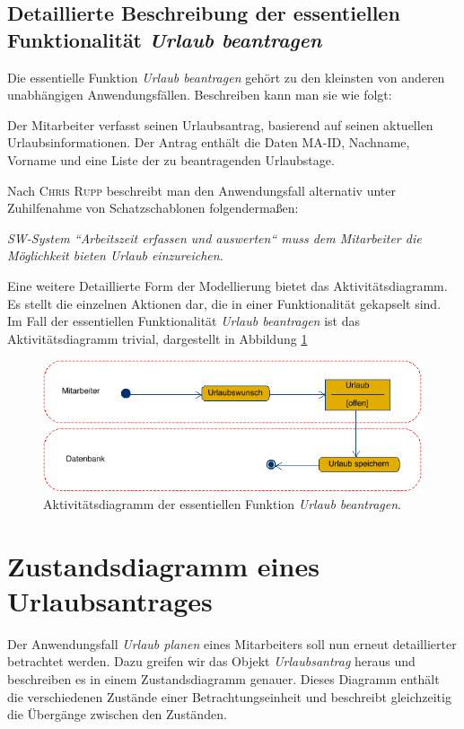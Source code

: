 \newpage

\section{Detaillierte Beschreibung der essentiellen Funktionalität \textit{Urlaub beantragen}}
Die essentielle Funktion \textit{Urlaub beantragen} geh\"ort zu den kleinsten von anderen unabh\"angigen Anwendungsf\"allen. Beschreiben kann man sie wie folgt: \newline 

Der Mitarbeiter verfasst seinen Urlaubsantrag, basierend auf seinen aktuellen Urlaubsinformationen. Der Antrag enth\"alt die Daten MA-ID, Nachname, Vorname und eine Liste der zu beantragenden Urlaubstage. \newline 

Nach \textsc{Chris Rupp} beschreibt man den Anwendungsfall alternativ unter Zuhilfenahme von Schatzschablonen folgenderma{\ss}en: \newline

\textit{SW-System ``Arbeitszeit erfassen und auswerten`` muss dem Mitarbeiter die Möglichkeit bieten Urlaub einzureichen.} \newline

\newline
Eine weitere Detaillierte Form der Modellierung bietet das Aktivit\"atsdiagramm. Es stellt die einzelnen Aktionen dar, die in einer Funktionalit\"at gekapselt sind. Im Fall der essentiellen Funktionalit\"at \textit{Urlaub beantragen} ist das Aktivit\"atsdiagramm trivial, dargestellt in Abbildung \ref{Aktivitaet}

\vspace{1cm}
\begin{figure}[hbp]
	\centering
	\includegraphics[width=\linewidth]{UML/Export/Urlaub_einreichen.png}
	\caption{Aktivit\"atsdiagramm der essentiellen Funktion \textit{Urlaub beantragen}.}
	\label{Aktivitaet}
\end{figure}

\chapter{Zustandsdiagramm eines Urlaubsantrages}
Der Anwendungsfall \textit{Urlaub planen} eines Mitarbeiters soll nun erneut detaillierter betrachtet werden. Dazu greifen wir das Objekt \textit{Urlaubsantrag} heraus und beschreiben es in einem Zustandsdiagramm genauer. Dieses Diagramm enth\"alt die verschiedenen Zust\"ande einer Betrachtungseinheit und beschreibt gleichzeitig die \"Uberg\"ange zwischen den Zust\"anden.  

